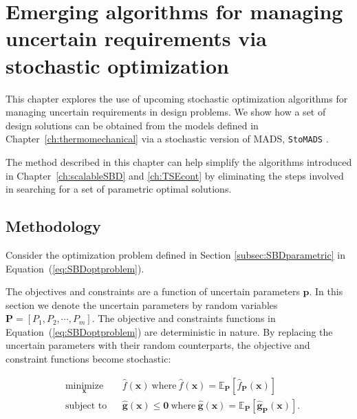 \chapter{Emerging algorithms for managing uncertain requirements via stochastic optimization}
\label{ch:stohasticopt}

This chapter explores the use of upcoming stochastic optimization algorithms for managing uncertain requirements in design problems. We show how a set of design solutions can be obtained from the models defined in Chapter~\ref{ch:thermomechanical} via a stochastic version of \ac{MADS}, \texttt{StoMADS} \cite{Audet2019}.

The method described in this chapter can help simplify the algorithms introduced in Chapter~\ref{ch:scalableSBD} and \ref{ch:TSEcont} by eliminating the steps involved in searching for a set of parametric optimal solutions.

\section{Methodology} \label{sec:STOmethods}

Consider the optimization problem defined in Section \ref{subsec:SBDparametric} in Equation~(\ref{eq:SBDoptproblem}).

The objectives and constraints are a function of uncertain parameters $\mathbf{p}$. In this section we denote the uncertain parameters by random variables $\mathbf{P} = \left[P_1,P_2,\cdots,P_m\right]$. The objective and constraints functions in Equation~(\ref{eq:SBDoptproblem}) are deterministic in nature. By replacing the uncertain parameters with their random counterparts, the objective and constraint functions become stochastic:

\begin{equation}
	\begin{aligned}
		& \underset{\mathbf{x}}{\text{minimize}}
		& & \hat{f}(\mathbf{x})~\textrm{where}~\hat{f}(\mathbf{x})=\mathbb{E}_{\mathbf{P}}\left[\hat{f}_{\mathbf{P}}(\mathbf{x})\right]\\
		& \text{subject to}
		& & \hat{\mathbf{g}}(\mathbf{x}) \le \mathbf{0}~\textrm{where}~\hat{\mathbf{g}}(\mathbf{x})=\mathbb{E}_{\mathbf{P}}\left[\hat{\mathbf{g}}_{\mathbf{P}}(\mathbf{x})\right].
	\end{aligned}
	\label{eq:STOoptproblem}
\end{equation}

